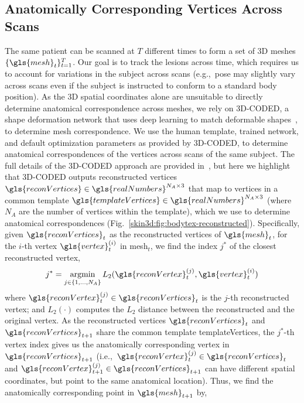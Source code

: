 \documentclass[journal]{IEEEtran}
\DeclareMathOperator*{\argmin}{argmin}
\def\ie{i.e.,~}
\def\eg{e.g.,~}
\begin{document}
\subsection{Anatomically Corresponding Vertices Across Scans}
\label{skin3d:sec:3dcoded}
The same patient can be scanned at $T$ different times to form a set of 3D meshes $\{\gls{mesh}_t\}_{t=1}^T$. Our goal is to track the lesions across time, which requires us to account for variations in the subject across scans (\eg pose may slightly vary across scans even if the subject is instructed to conform to a standard body position). As the 3D spatial coordinates alone are unsuitable to directly determine anatomical correspondence across meshes, we rely on 3D-CODED, a shape deformation network that uses deep learning to match deformable shapes~\citep{Groueix2018,Deprelle2019}, to determine mesh correspondence. We use the human template, trained network, and default optimization parameters as provided by 3D-CODED, to determine anatomical correspondences of the vertices across scans of the same subject. The full details of the 3D-CODED approach are provided in~\citet{Groueix2018}, but here we highlight that 3D-CODED outputs reconstructed vertices $\gls{reconVertices} \in \gls{realNumbers}^{N_A \times 3}$ that map to vertices in a common template $\gls{templateVertices} \in \gls{realNumbers}^{N_A \times 3}$ (where $N_A$ are the number of vertices within the template), which we use to determine anatomical correspondences (Fig.~\ref{skin3d:fig:bodytex-reconstructed}). Specifically, given $\gls{reconVertices}_t$ as the reconstructed vertices of $\gls{mesh}_t$, for the $i$-th vertex $\gls{vertex}^{(i)}_t$ in \gls{mesh}$_t$, we find the index $j^*$ of the closest reconstructed vertex,
\begin{equation}
   j^* = \argmin_{j \in \{1, \dots, N_A \}} L_2(\gls{reconVertex}_t^{(j)}, \gls{vertex}^{(i)}_t)
   \label{skin3d:eqn:closestReconstructed}
\end{equation}
where $\gls{reconVertex}_t^{(j)} \in \gls{reconVertices}_t$ is the $j$-th reconstructed vertex; and $L_2(\cdot)$ computes the $L_2$ distance between the reconstructed and the original vertex. As the reconstructed vertices $\gls{reconVertices}_t$ and $\gls{reconVertices}_{t+1}$ share the common template \gls{templateVertices}, the $j^*$-th vertex index gives us the anatomically corresponding vertex in $\gls{reconVertices}_{t+1}$ (\ie $\gls{reconVertex}^{(j)}_t \in \gls{reconVertices}_t$ and $\gls{reconVertex}^{(j)}_{t+1} \in \gls{reconVertices}_{t+1}$ can have different spatial coordinates, but point to the same anatomical location). Thus, we find the anatomically corresponding point in $\gls{mesh}_{t+1}$ by,
\end{document}
